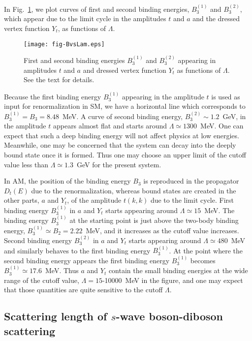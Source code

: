 \documentclass[jkps,preprint,fleqn,showpacs,showkeys]{revtex4}
\begin{document}
In Fig.~\ref{fig;BvsLam}, we plot curves of first and second
binding energies, $B_3^{(1)}$ and $B_3^{(2)}$,
which appear due to the limit cycle
in the amplitudes $t$ and $a$ and
the dressed vertex function $Y_t$,
as functions of $\Lambda$.
%
\begin{figure}[t]
\texttt{[image: fig-BvsLam.eps]}
\caption{First and second binding energies $B_3^{(1)}$ and $B_3^{(2)}$
appearing in amplitudes $t$ and $a$ and dressed vertex function $Y_t$
as functions of $\Lambda$. See the text for details.
}
\label{fig;BvsLam}
\end{figure}
%
Because the first binding energy $B_3^{(1)}$ appearing in the amplitude $t$
is used as input for renormalization in SM,
we have a horizontal line which corresponds to $B_3^{(1)} = B_3=8.48$~MeV.
%
A curve of second binding energy, $B_3^{(2)}\sim 1.2$~GeV,
in the amplitude $t$ appears almost flat and
starts around $\Lambda\simeq 1300$~MeV.
One can expect that such a deep binding energy will not affect physics
at low energies.
Meanwhile, one may be concerned that the system
can decay into the deeply bound state once it is formed.
Thus one may choose an upper limit of the cutoff value less than
$\Lambda \simeq 1.3$~GeV for the present system.

In AM, the position of the binding energy $B_3$ is reproduced in
the propagator $D_t(E)$ due to the renormalization,
whereas bound states are created
in the other parts, $a$ and $Y_t$, of the amplitude $t(k,k)$
due to the limit cycle.
%
First binding energy $B_3^{(1)}$
in $a$ and $Y_t$ starts
appearing around $\Lambda \simeq 15$~MeV.
The binding energy $B_3^{(1)}$ at the starting point is
just above the two-body binding energy, $B_3^{(1)}\simeq B_2=2.22$~MeV,
and it increases as the cutoff value increases.
%
Second binding energy $B_3^{(2)}$ in $a$ and $Y_t$ starts appearing
around $\Lambda\simeq 480$~MeV
and similarly behaves to the first binding energy $B_3^{(1)}$.
At the point where the second binding energy appears
the first binding energy $B_3^{(1)}$ becomes $B_3^{(1)}\simeq 17.6$~MeV.
%
Thus $a$ and $Y_t$ contain the small binding energies at the wide range
of the cutoff value, $\Lambda = 15$-10000~MeV in the figure,
and one may expect that those quantities are quite sensitive
to the cutoff $\Lambda$.


\subsection{Scattering length of $s$-wave boson-diboson scattering}
\end{document}
